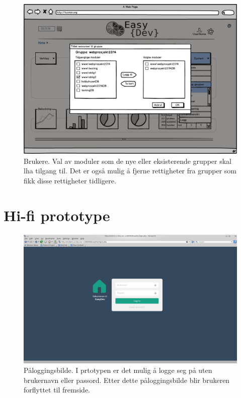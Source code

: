 \begin{figure}[ht]
\centering
\includegraphics[width=\lowB\textwidth,height=\textheight,keepaspectratio]{./img/prosessdokumentasjon/lowfi/b4.png}
\caption[Low-fi Brukere 4]{Brukere. Val av moduler som de nye eller eksisterende grupper skal lha tilgang til. Det er også mulig å fjerne rettigheter fra grupper som fikk disse rettigheter tidligere.}
\label{fig:brukerelow4}
\end{figure}


\section{Hi-fi prototype} \label{sec:appendiksHiFi}
\begin{figure}[ht]
\includegraphics[width=\textwidth,height=\textheight,keepaspectratio]{./img/prosessdokumentasjon/hifi/login.png}
\caption[Hi-fi Påloggingsbilde]{Påloggingsbilde. I prtotypen er det mulig å logge seg på uten brukernavn eller passord. Etter dette påloggingsbilde blir brukeren forflyttet til fremside.}
\label{fig:loginhi}
\end{figure}

